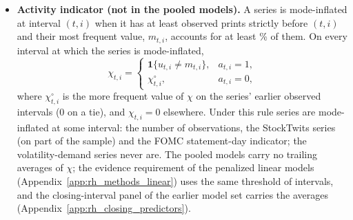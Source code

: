 \begin{itemize}
\item \textbf{Activity indicator (not in the pooled models).} A series is mode-inflated at interval $(t,i)$ when it has
  at least \rhdmModeMinPrints{} observed prints strictly before $(t,i)$ and their most frequent value, $m_{t,i}$,
  accounts for at least \rhdmModeShare\% of them. On every interval at which the series is mode-inflated,
  \[
    \chi_{t,i} =
    \begin{cases}
      \mathbf{1}\{u_{t,i} \ne m_{t,i}\}, & a_{t,i} = 1,\\
      \chi^{\circ}_{t,i}, & a_{t,i} = 0,
    \end{cases}
  \]
  where $\chi^{\circ}_{t,i}$ is the more frequent value of $\chi$ on the series' earlier observed intervals (0 on a
  tie), and $\chi_{t,i} = 0$ elsewhere. Under this rule \rhdmNActivePooled{} series are mode-inflated at some interval:
  the number of observations, the \bkSizeSent{} StockTwits series (on part of the sample) and the FOMC statement-day
  indicator; the volatility-demand series never are. The pooled models carry no trailing averages of $\chi$; the
  evidence requirement of the penalized linear models (Appendix~\ref{app:rh_methods_linear}) uses the same threshold of
  \rhdmModeMinPrints{} intervals, and the closing-interval panel of the earlier model set carries the averages
  (Appendix~\ref{app:rh_closing_predictors}).
\end{itemize}

